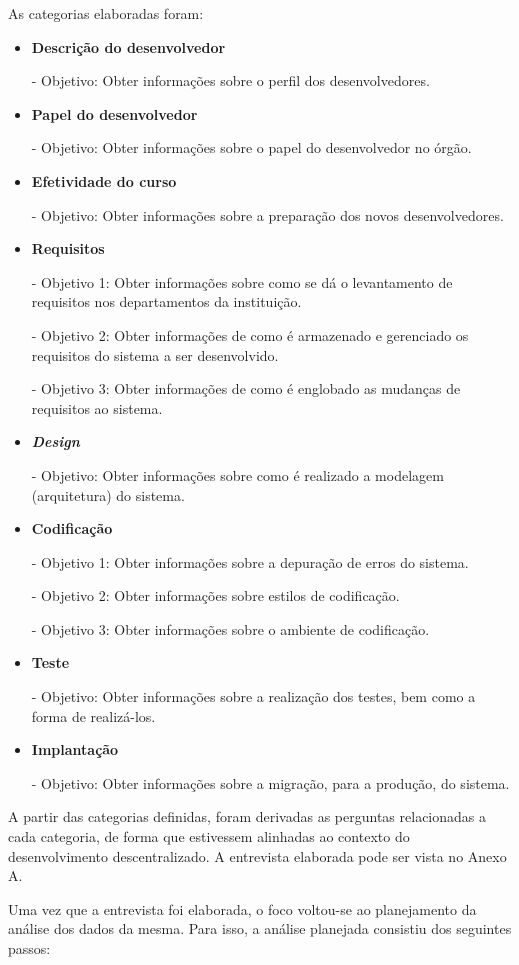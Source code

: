 As categorias elaboradas foram:
\begin{itemize}
	\item \textbf{Descrição do desenvolvedor} 
	
	- Objetivo: Obter informações sobre o perfil dos desenvolvedores.
	\item \textbf{Papel do desenvolvedor}
	
	- Objetivo: Obter informações sobre o papel do desenvolvedor no órgão.
	\item \textbf{Efetividade do curso}
	
	- Objetivo: Obter informações sobre a preparação dos novos desenvolvedores.
	\item \textbf{Requisitos}
	
	- Objetivo 1: Obter informações sobre como se dá o levantamento de requisitos nos departamentos da instituição.
	
	- Objetivo 2: Obter informações de como é armazenado e gerenciado os requisitos do sistema a ser desenvolvido.
	
	- Objetivo 3: Obter informações de como é englobado as mudanças de requisitos ao sistema.
	\item \textbf{\textit{Design}}
	
	- Objetivo: Obter informações sobre como é realizado a modelagem (arquitetura) do sistema.
	\item \textbf{Codificação}
	
	- Objetivo 1: Obter informações sobre a depuração de erros do sistema.
	
	- Objetivo 2: Obter informações sobre estilos de codificação.
	
	- Objetivo 3: Obter informações sobre o ambiente de codificação.
	
	\item \textbf{Teste}
	
	- Objetivo: Obter informações sobre a realização dos testes, bem como a forma de realizá-los.
	\item \textbf{Implantação}
	
	- Objetivo: Obter informações sobre a migração, para a produção, do sistema.
\end{itemize}

A partir das categorias definidas, foram derivadas as perguntas relacionadas a cada categoria, de forma que estivessem alinhadas ao contexto do desenvolvimento descentralizado. A entrevista elaborada pode ser vista no Anexo A.

Uma vez que a entrevista foi elaborada, o foco voltou-se ao planejamento da análise dos dados da mesma. Para isso, a análise planejada consistiu dos seguintes passos:

